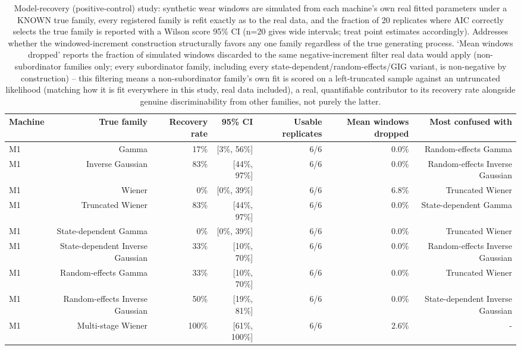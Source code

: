 \begin{table}[t]
\centering
\caption{Model-recovery (positive-control) study: synthetic wear windows are simulated from each machine's own real fitted parameters under a KNOWN true family, every registered family is refit exactly as to the real data, and the fraction of 20 replicates where AIC correctly selects the true family is reported with a Wilson score 95\% CI (n=20 gives wide intervals; treat point estimates accordingly). Addresses whether the windowed-increment construction structurally favors any one family regardless of the true generating process. `Mean windows dropped' reports the fraction of simulated windows discarded to the same negative-increment filter real data would apply (non-subordinator families only; every subordinator family, including every state-dependent/random-effects/GIG variant, is non-negative by construction) -- this filtering means a non-subordinator family's own fit is scored on a left-truncated sample against an untruncated likelihood (matching how it is fit everywhere in this study, real data included), a real, quantifiable contributor to its recovery rate alongside genuine discriminability from other families, not purely the latter.}
\label{tab:model-recovery}
\begin{tabular}{lrrrrrr}
\toprule
Machine & True family & Recovery rate & 95\% CI & Usable replicates & Mean windows dropped & Most confused with \\
\midrule
M1 & Gamma & 17\% & [3\%, 56\%] & 6/6 & 0.0\% & Random-effects Gamma \\
M1 & Inverse Gaussian & 83\% & [44\%, 97\%] & 6/6 & 0.0\% & Random-effects Inverse Gaussian \\
M1 & Wiener & 0\% & [0\%, 39\%] & 6/6 & 6.8\% & Truncated Wiener \\
M1 & Truncated Wiener & 83\% & [44\%, 97\%] & 6/6 & 0.0\% & State-dependent Gamma \\
M1 & State-dependent Gamma & 0\% & [0\%, 39\%] & 6/6 & 0.0\% & Truncated Wiener \\
M1 & State-dependent Inverse Gaussian & 33\% & [10\%, 70\%] & 6/6 & 0.0\% & Random-effects Inverse Gaussian \\
M1 & Random-effects Gamma & 33\% & [10\%, 70\%] & 6/6 & 0.0\% & Truncated Wiener \\
M1 & Random-effects Inverse Gaussian & 50\% & [19\%, 81\%] & 6/6 & 0.0\% & State-dependent Inverse Gaussian \\
M1 & Multi-stage Wiener & 100\% & [61\%, 100\%] & 6/6 & 2.6\% & - \\

\end{tabular}
\end{table}
